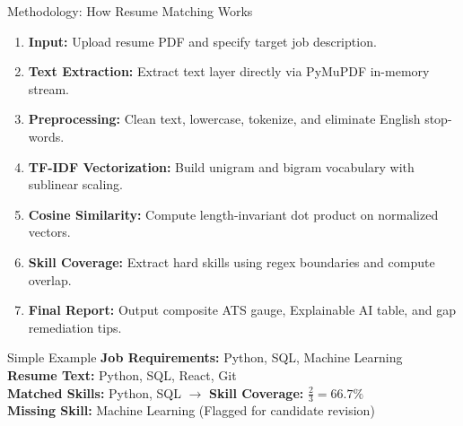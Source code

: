\documentclass[aspectratio=169, 10pt]{beamer}
\begin{document}
\begin{frame}{Methodology: How Resume Matching Works}
  \begin{enumerate}
    \item \textbf{Input:} Upload resume PDF and specify target job description.
    \item \textbf{Text Extraction:} Extract text layer directly via PyMuPDF in-memory stream.
    \item \textbf{Preprocessing:} Clean text, lowercase, tokenize, and eliminate English stop-words.
    \item \textbf{TF-IDF Vectorization:} Build unigram and bigram vocabulary with sublinear scaling.
    \item \textbf{Cosine Similarity:} Compute length-invariant dot product on normalized vectors.
    \item \textbf{Skill Coverage:} Extract hard skills using regex boundaries and compute overlap.
    \item \textbf{Final Report:} Output composite ATS gauge, Explainable AI table, and gap remediation tips.
  \end{enumerate}

  \begin{block}{Simple Example}
    \textbf{Job Requirements:} Python, SQL, Machine Learning \\
    \textbf{Resume Text:} Python, SQL, React, Git \\
    \textbf{Matched Skills:} Python, SQL $\rightarrow$ \textbf{Skill Coverage:} $\frac{2}{3} = 66.7\%$ \\
    \textbf{Missing Skill:} Machine Learning (Flagged for candidate revision)
  \end{block}
\end{frame}
\end{document}
